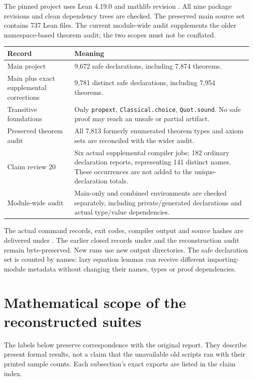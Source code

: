 The pinned project uses Lean 4.19.0 and mathlib revision
.
All nine package revisions and clean dependency trees are checked. The preserved main source set contains 737 Lean files. The current module-wide audit supplements the older namespace-based theorem audit; the two scopes must not be conflated.

\begin{longtable}{@{}p{}p{}@{}}
\toprule Record & Meaning\\\midrule\endhead
Main project & 9,672 safe declarations, including 7,874 theorems.\\
Main plus exact supplemental corrections & 9,781 distinct safe declarations, including 7,954 theorems.\\
Transitive foundations & Only \texttt{propext}, \texttt{Classical.choice}, \texttt{Quot.sound}. No safe proof may reach an unsafe or partial artifact.\\
Preserved theorem audit & All 7,813 formerly enumerated theorem types and axiom sets are reconciled with the wider audit.\\
Claim review 20 & Six actual supplemental compiler jobs; 182 ordinary declaration reports, representing 141 distinct names. These occurrences are not added to the unique-declaration totals.\\
Module-wide audit & Main-only and combined environments are checked separately, including private/generated declarations and actual type/value dependencies.\\
\bottomrule\end{longtable}

The actual command records, exit codes, compiler output and source hashes are delivered under . The earlier closed records under  and the reconstruction audit remain byte-preserved. New runs use new output directories. The safe declaration set is counted by names: lazy equation lemmas can receive different importing-module metadata without changing their names, types or proof dependencies.



\section{Mathematical scope of the reconstructed suites}\label{what-each-suite-actually-checks}

The labels below preserve correspondence with the original report. They describe present formal results, not a claim that the unavailable old scripts ran with their printed sample counts. Each subsection's exact exports are listed in the claim index.

